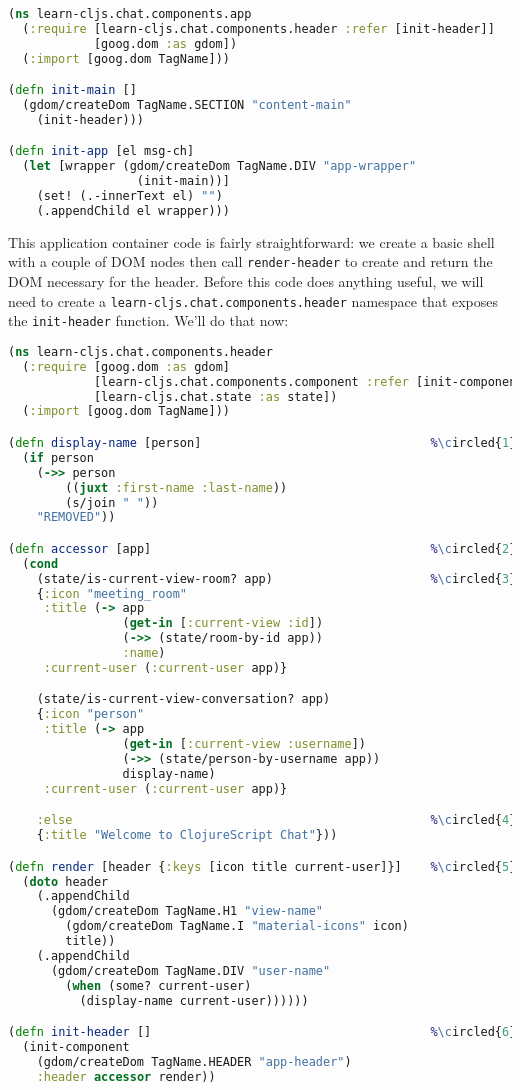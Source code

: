 \documentclass[10pt,twoside,openright]{memoir}
\newcommand*\circled[1]{\tikz[baseline=(char.base)]{
            \node[shape=circle,draw,inner sep=1pt] (char) {#1};}}
\begin{document}
\begin{lstlisting}[language=Clojure, caption={chat/components/app.cljs}]
(ns learn-cljs.chat.components.app
  (:require [learn-cljs.chat.components.header :refer [init-header]]
            [goog.dom :as gdom])
  (:import [goog.dom TagName]))

(defn init-main []
  (gdom/createDom TagName.SECTION "content-main"
    (init-header)))

(defn init-app [el msg-ch]
  (let [wrapper (gdom/createDom TagName.DIV "app-wrapper"
                  (init-main))]
    (set! (.-innerText el) "")
    (.appendChild el wrapper)))
\end{lstlisting}

This application container code is fairly straightforward: we create a
basic shell with a couple of DOM nodes then call \texttt{render-header}
to create and return the DOM necessary for the header. Before this code
does anything useful, we will need to create a
\texttt{learn-cljs.chat.components.header} namespace that exposes the
\texttt{init-header} function. We'll do that now:

\begin{lstlisting}[language=Clojure, caption={state/components/header.cljs}]
(ns learn-cljs.chat.components.header
  (:require [goog.dom :as gdom]
            [learn-cljs.chat.components.component :refer [init-component]]
            [learn-cljs.chat.state :as state])
  (:import [goog.dom TagName]))

(defn display-name [person]                                %\circled{1}%
  (if person
    (->> person
        ((juxt :first-name :last-name))
        (s/join " "))
    "REMOVED"))

(defn accessor [app]                                       %\circled{2}%
  (cond
    (state/is-current-view-room? app)                      %\circled{3}%
    {:icon "meeting_room"
     :title (-> app
                (get-in [:current-view :id])
                (->> (state/room-by-id app))
                :name)
     :current-user (:current-user app)}

    (state/is-current-view-conversation? app)
    {:icon "person"
     :title (-> app
                (get-in [:current-view :username])
                (->> (state/person-by-username app))
                display-name)
     :current-user (:current-user app)}

    :else                                                  %\circled{4}%
    {:title "Welcome to ClojureScript Chat"}))

(defn render [header {:keys [icon title current-user]}]    %\circled{5}%
  (doto header
    (.appendChild
      (gdom/createDom TagName.H1 "view-name"
        (gdom/createDom TagName.I "material-icons" icon)
        title))
    (.appendChild
      (gdom/createDom TagName.DIV "user-name"
        (when (some? current-user)
          (display-name current-user))))))

(defn init-header []                                       %\circled{6}%
  (init-component
    (gdom/createDom TagName.HEADER "app-header")
    :header accessor render))
\end{lstlisting}
\end{document}
